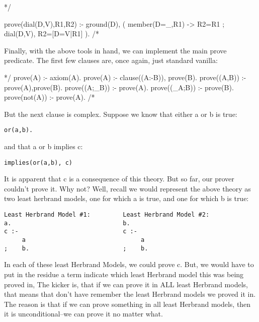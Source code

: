 \documentclass{book}[9pt]
\newenvironment{code}%
{\small \verbatim}%
{\endverbatim \large}
\begin{document}
\begin{code} 
*/

prove(dial(D,V),R1,R2) :-
        ground(D),
        ( member(D=_,R1) ->
            R2=R1
        ;
            dial(D,V),
            R2=[D=V|R1]
        ).
/*
\end{code}

Finally, with the above tools in hand, we can implement the main prove
predicate.  The first few clauses are, once again, just standard
vanilla:

\begin{code}
*/
prove(A)      :- axiom(A).
prove(A)      :- clause((A:-B)), prove(B).
prove((A,B))  :- prove(A),prove(B).
prove((A;_B)) :- prove(A).
prove((_A;B)) :- prove(B).
prove(not(A)) :- \+ prove(A).
/*
\end{code}

But the next clause is complex.  Suppose we know that either a or b is
true:
\begin{verbatim}
or(a,b).
\end{verbatim}
\noindent and that a or b implies c:
\begin{verbatim}
implies(or(a,b), c)
\end{verbatim}
\noindent It is apparent that c is a consequence of this theory.  But
so far, our prover couldn't prove it.  Why not?  Well, recall we would
represent the above theory as two least herbrand models, one for which
a is true, and one for which b is true:
\begin{verbatim}
Least Herbrand Model #1:         Least Herbrand Model #2:
a.                               b.
c :-                             c :-
     a                                a
;    b.                          ;    b.
\end{verbatim}
\noindent In each of these least Herbrand Models, we could prove c.
But, we would have to put in the residue a term indicate which least
Herbrand model this was being proved in, The kicker is, that if we can
prove it in ALL least Herbrand models, that means that don't have
remember the least Herbrand models we proved it in.  The reason is
that if we can prove something in all least Herbrand models, then it
is unconditional--we can prove it no matter what.
\end{document}
